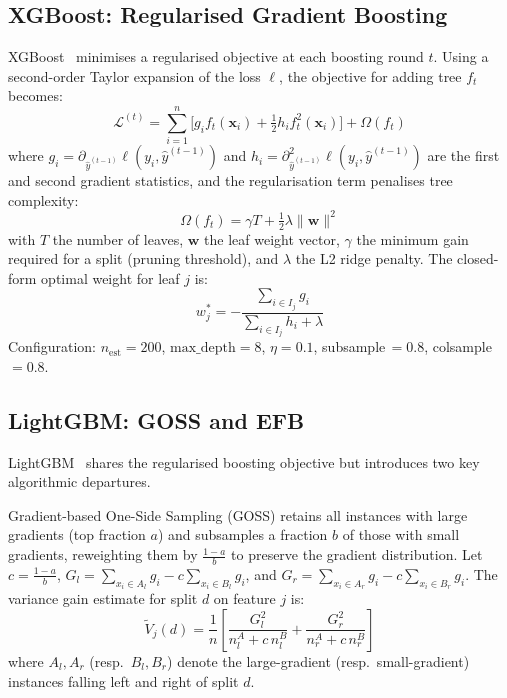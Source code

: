 \documentclass[5p, times]{elsarticle}
\begin{document}
\subsection{XGBoost: Regularised Gradient Boosting}
XGBoost~\cite{xgboost2016} minimises a regularised objective at each boosting round $t$. Using a second-order Taylor expansion of the loss $\ell$, the objective for adding tree $f_t$ becomes:
\begin{equation}
    \mathcal{L}^{(t)} = \sum_{i=1}^{n}
    \bigl[g_i f_t(\mathbf{x}_i) +
    \tfrac{1}{2}h_i f_t^2(\mathbf{x}_i)\bigr] + \Omega(f_t)
\end{equation}
where $g_i = \partial_{\hat{y}^{(t-1)}}\ell(y_i,\hat{y}^{(t-1)})$
and $h_i = \partial^2_{\hat{y}^{(t-1)}}\ell(y_i,\hat{y}^{(t-1)})$
are the first and second gradient statistics, and the regularisation term penalises tree complexity:
\begin{equation}
    \Omega(f_t) = \gamma T + \tfrac{1}{2}\lambda\|\mathbf{w}\|^2
\end{equation}
with $T$ the number of leaves, $\mathbf{w}$ the leaf weight vector, $\gamma$ the minimum gain required for a split (pruning threshold), and $\lambda$ the L2 ridge penalty. The closed-form optimal weight
for leaf $j$ is:
\begin{equation}
    w_j^* = -\frac{\sum_{i\in I_j}g_i}{\sum_{i\in I_j}h_i + \lambda}
\end{equation}
Configuration: $n_{\text{est}}=200$, $\text{max\_depth}=8$,
$\eta=0.1$, subsample\,$=0.8$, colsample\,$=0.8$.

\subsection{LightGBM: GOSS and EFB}
LightGBM~\cite{lightgbm2017} shares the regularised boosting objective but introduces two key algorithmic departures.

Gradient-based One-Side Sampling (GOSS) retains all
instances with large gradients (top fraction $a$) and subsamples a fraction $b$ of those with small gradients, reweighting them by $\frac{1-a}{b}$ to preserve the gradient distribution.
Let $c = \frac{1-a}{b}$,
$G_l = \sum_{x_i\in A_l}g_i - c\sum_{x_i\in B_l}g_i$, and
$G_r = \sum_{x_i\in A_r}g_i - c\sum_{x_i\in B_r}g_i$.
The variance gain estimate for split $d$ on feature $j$ is:
\begin{equation}
    \tilde{V}_j(d) = \frac{1}{n}\!\left[
    \frac{G_l^2}{n_l^A + c\,n_l^B}
    +
    \frac{G_r^2}{n_r^A + c\,n_r^B}
    \right]
\end{equation}
where $A_l,A_r$ (resp.\ $B_l,B_r$) denote the large-gradient
(resp.\ small-gradient) instances falling left and right of
split $d$.
\end{document}
